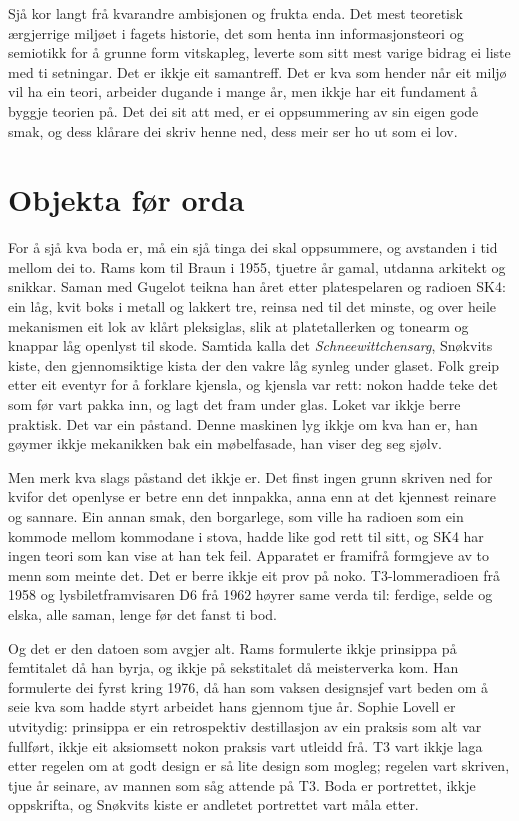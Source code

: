 Sjå kor langt frå kvarandre ambisjonen og frukta enda. Det mest teoretisk ærgjerrige miljøet i fagets historie, det som henta inn informasjonsteori og semiotikk for å grunne form vitskapleg, leverte som sitt mest varige bidrag ei liste med ti setningar. Det er ikkje eit samantreff. Det er kva som hender når eit miljø vil ha ein teori, arbeider dugande i mange år, men ikkje har eit fundament å byggje teorien på. Det dei sit att med, er ei oppsummering av sin eigen gode smak, og dess klårare dei skriv henne ned, dess meir ser ho ut som ei lov.

\section{Objekta før orda}

For å sjå kva boda er, må ein sjå tinga dei skal oppsummere, og avstanden i tid mellom dei to. Rams kom til Braun i 1955, tjuetre år gamal, utdanna arkitekt og snikkar. Saman med Gugelot teikna han året etter platespelaren og radioen SK4: ein låg, kvit boks i metall og lakkert tre, reinsa ned til det minste, og over heile mekanismen eit lok av klårt pleksiglas, slik at platetallerken og tonearm og knappar låg openlyst til skode. Samtida kalla det \textit{Schneewittchensarg}, Snøkvits kiste, den gjennomsiktige kista der den vakre låg synleg under glaset. Folk greip etter eit eventyr for å forklare kjensla, og kjensla var rett: nokon hadde teke det som før vart pakka inn, og lagt det fram under glas. Loket var ikkje berre praktisk. Det var ein påstand. Denne maskinen lyg ikkje om kva han er, han gøymer ikkje mekanikken bak ein møbelfasade, han viser deg seg sjølv.

Men merk kva slags påstand det ikkje er. Det finst ingen grunn skriven ned for kvifor det openlyse er betre enn det innpakka, anna enn at det kjennest reinare og sannare. Ein annan smak, den borgarlege, som ville ha radioen som ein kommode mellom kommodane i stova, hadde like god rett til sitt, og SK4 har ingen teori som kan vise at han tek feil. Apparatet er framifrå formgjeve av to menn som meinte det. Det er berre ikkje eit prov på noko. T3-lommeradioen frå 1958 og lysbiletframvisaren D6 frå 1962 høyrer same verda til: ferdige, selde og elska, alle saman, lenge før det fanst ti bod.

Og det er den datoen som avgjer alt. Rams formulerte ikkje prinsippa på femtitalet då han byrja, og ikkje på sekstitalet då meisterverka kom. Han formulerte dei fyrst kring 1976, då han som vaksen designsjef vart beden om å seie kva som hadde styrt arbeidet hans gjennom tjue år. Sophie Lovell er utvitydig: prinsippa er ein retrospektiv destillasjon av ein praksis som alt var fullført, ikkje eit aksiomsett nokon praksis vart utleidd frå\autocite{lovell2011rams}. T3 vart ikkje laga etter regelen om at godt design er så lite design som mogleg; regelen vart skriven, tjue år seinare, av mannen som såg attende på T3. Boda er portrettet, ikkje oppskrifta, og Snøkvits kiste er andletet portrettet vart måla etter.

